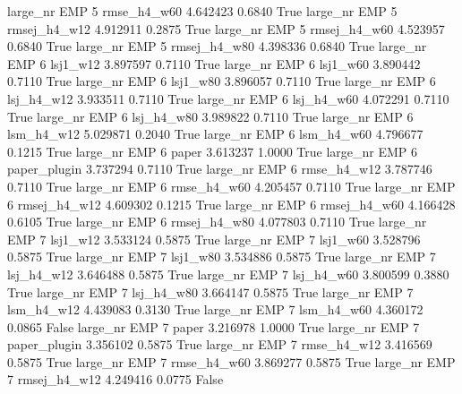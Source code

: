   large_nr      EMP                 5  rmse_h4_w60    4.642423      0.6840    True
  large_nr      EMP                 5 rmsej_h4_w12    4.912911      0.2875    True
  large_nr      EMP                 5 rmsej_h4_w60    4.523957      0.6840    True
  large_nr      EMP                 5 rmsej_h4_w80    4.398336      0.6840    True
  large_nr      EMP                 6     lsj1_w12    3.897597      0.7110    True
  large_nr      EMP                 6     lsj1_w60    3.890442      0.7110    True
  large_nr      EMP                 6     lsj1_w80    3.896057      0.7110    True
  large_nr      EMP                 6   lsj_h4_w12    3.933511      0.7110    True
  large_nr      EMP                 6   lsj_h4_w60    4.072291      0.7110    True
  large_nr      EMP                 6   lsj_h4_w80    3.989822      0.7110    True
  large_nr      EMP                 6   lsm_h4_w12    5.029871      0.2040    True
  large_nr      EMP                 6   lsm_h4_w60    4.796677      0.1215    True
  large_nr      EMP                 6        paper    3.613237      1.0000    True
  large_nr      EMP                 6 paper_plugin    3.737294      0.7110    True
  large_nr      EMP                 6  rmse_h4_w12    3.787746      0.7110    True
  large_nr      EMP                 6  rmse_h4_w60    4.205457      0.7110    True
  large_nr      EMP                 6 rmsej_h4_w12    4.609302      0.1215    True
  large_nr      EMP                 6 rmsej_h4_w60    4.166428      0.6105    True
  large_nr      EMP                 6 rmsej_h4_w80    4.077803      0.7110    True
  large_nr      EMP                 7     lsj1_w12    3.533124      0.5875    True
  large_nr      EMP                 7     lsj1_w60    3.528796      0.5875    True
  large_nr      EMP                 7     lsj1_w80    3.534886      0.5875    True
  large_nr      EMP                 7   lsj_h4_w12    3.646488      0.5875    True
  large_nr      EMP                 7   lsj_h4_w60    3.800599      0.3880    True
  large_nr      EMP                 7   lsj_h4_w80    3.664147      0.5875    True
  large_nr      EMP                 7   lsm_h4_w12    4.439083      0.3130    True
  large_nr      EMP                 7   lsm_h4_w60    4.360172      0.0865   False
  large_nr      EMP                 7        paper    3.216978      1.0000    True
  large_nr      EMP                 7 paper_plugin    3.356102      0.5875    True
  large_nr      EMP                 7  rmse_h4_w12    3.416569      0.5875    True
  large_nr      EMP                 7  rmse_h4_w60    3.869277      0.5875    True
  large_nr      EMP                 7 rmsej_h4_w12    4.249416      0.0775   False
